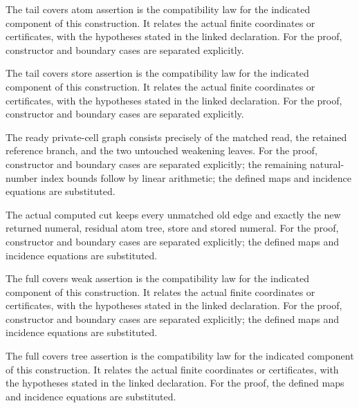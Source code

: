 The tail covers atom assertion is the compatibility law for the indicated component of this construction. It relates the actual finite coordinates or certificates, with the hypotheses stated in the linked declaration.
For the proof, constructor and boundary cases are separated explicitly.
\par{}

The tail covers store assertion is the compatibility law for the indicated component of this construction. It relates the actual finite coordinates or certificates, with the hypotheses stated in the linked declaration.
For the proof, constructor and boundary cases are separated explicitly.
\par{}

The ready private-cell graph consists precisely of the matched read, the retained reference branch, and the two untouched weakening leaves.
For the proof, constructor and boundary cases are separated explicitly; the remaining natural-number index bounds follow by linear arithmetic; the defined maps and incidence equations are substituted.
\par{}

The actual computed cut keeps every unmatched old edge and exactly the new returned numeral, residual atom tree, store and stored numeral.
For the proof, constructor and boundary cases are separated explicitly; the defined maps and incidence equations are substituted.
\par{}

The full covers weak assertion is the compatibility law for the indicated component of this construction. It relates the actual finite coordinates or certificates, with the hypotheses stated in the linked declaration.
For the proof, constructor and boundary cases are separated explicitly; the defined maps and incidence equations are substituted.
\par{}

The full covers tree assertion is the compatibility law for the indicated component of this construction. It relates the actual finite coordinates or certificates, with the hypotheses stated in the linked declaration.
For the proof, the defined maps and incidence equations are substituted.
\par{}

